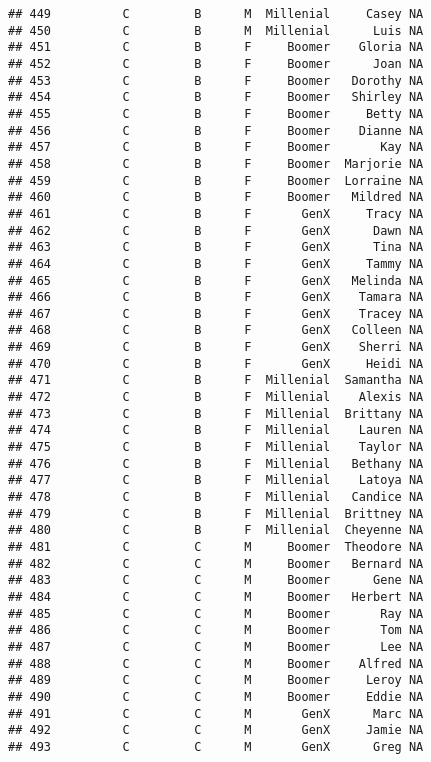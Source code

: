 \documentclass[
]{article}
\begin{document}
\begin{verbatim}
## 449          C         B      M  Millenial     Casey NA
## 450          C         B      M  Millenial      Luis NA
## 451          C         B      F     Boomer    Gloria NA
## 452          C         B      F     Boomer      Joan NA
## 453          C         B      F     Boomer   Dorothy NA
## 454          C         B      F     Boomer   Shirley NA
## 455          C         B      F     Boomer     Betty NA
## 456          C         B      F     Boomer    Dianne NA
## 457          C         B      F     Boomer       Kay NA
## 458          C         B      F     Boomer  Marjorie NA
## 459          C         B      F     Boomer  Lorraine NA
## 460          C         B      F     Boomer   Mildred NA
## 461          C         B      F       GenX     Tracy NA
## 462          C         B      F       GenX      Dawn NA
## 463          C         B      F       GenX      Tina NA
## 464          C         B      F       GenX     Tammy NA
## 465          C         B      F       GenX   Melinda NA
## 466          C         B      F       GenX    Tamara NA
## 467          C         B      F       GenX    Tracey NA
## 468          C         B      F       GenX   Colleen NA
## 469          C         B      F       GenX    Sherri NA
## 470          C         B      F       GenX     Heidi NA
## 471          C         B      F  Millenial  Samantha NA
## 472          C         B      F  Millenial    Alexis NA
## 473          C         B      F  Millenial  Brittany NA
## 474          C         B      F  Millenial    Lauren NA
## 475          C         B      F  Millenial    Taylor NA
## 476          C         B      F  Millenial   Bethany NA
## 477          C         B      F  Millenial    Latoya NA
## 478          C         B      F  Millenial   Candice NA
## 479          C         B      F  Millenial  Brittney NA
## 480          C         B      F  Millenial  Cheyenne NA
## 481          C         C      M     Boomer  Theodore NA
## 482          C         C      M     Boomer   Bernard NA
## 483          C         C      M     Boomer      Gene NA
## 484          C         C      M     Boomer   Herbert NA
## 485          C         C      M     Boomer       Ray NA
## 486          C         C      M     Boomer       Tom NA
## 487          C         C      M     Boomer       Lee NA
## 488          C         C      M     Boomer    Alfred NA
## 489          C         C      M     Boomer     Leroy NA
## 490          C         C      M     Boomer     Eddie NA
## 491          C         C      M       GenX      Marc NA
## 492          C         C      M       GenX     Jamie NA
## 493          C         C      M       GenX      Greg NA

\end{verbatim}
\end{document}
